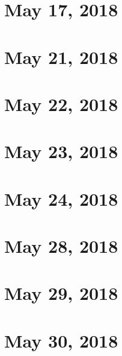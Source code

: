 \documentclass{article}
\begin{document}
\section{May 17, 2018}
\newpage


\section{May 21, 2018}
\newpage


\section{May 22, 2018}
\newpage


\section{May 23, 2018}
\newpage


\section{May 24, 2018}
\newpage


\section{May 28, 2018}
\newpage


\section{May 29, 2018}
\newpage


\section{May 30, 2018}
\newpage
\end{document}
